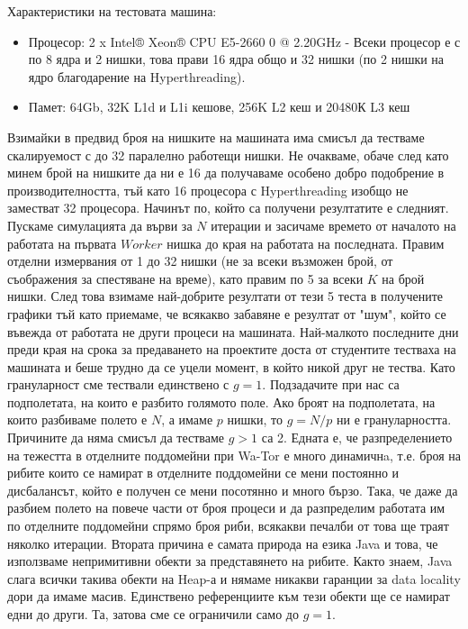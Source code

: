 \documentclass[12pt]{article}
\begin{document}
Характеристики на тестовата машина: 
\begin{itemize}
	\item Процесор: 2 x Intel® Xeon® CPU E5-2660 0 @ 2.20GHz - Всеки процесор е с по 8 ядра и 2 нишки,
	това прави 16 ядра общо и 32 нишки (по 2 нишки на ядро благодарение на Hyperthreading).
	\item Памет: 64Gb, 32K L1d и L1i кешове, 256K L2 кеш и 20480К L3 кеш
\end{itemize}
Взимайки в предвид броя на нишките на машината има смисъл да тестваме скалируемост с до 32 паралелно работещи нишки.
Не очакваме, обаче след като минем брой на нишките да ни е 16 да получаваме особено добро подобрение в производителността,
тъй като 16 процесора с Hyperthreading изобщо не заместват 32 процесора.
\bigbreak
Начинът по, който са получени резултатите е следният. Пускаме симулацията да върви за $N$ итерации
и засичаме времето от началото на работата на първата $Worker$ нишка до края на работата на последната.
Правим отделни измервания от 1 до 32 нишки (не за всеки възможен брой, от съображения за
спестяване на време), като правим по 5 за всеки $K$ на брой нишки. След това
взимаме най-добрите резултати от тези 5 теста в получените графики тъй като приемаме, че всякакво забавяне е резултат от
"шум", който се въвежда от работата не други процеси на машината. Най-малкото последните дни преди края
на срока за предаването на проектите доста от студентите тестваха на машината и беше трудно да се уцели
момент, в който никой друг не тества.
\bigbreak
Като грануларност сме тествали единствено с $g = 1$. Подзадачите при нас са подполетата, на които е разбито голямото поле.
Ако броят на подполетата, на които разбиваме полето е $N$, а имаме $p$ нишки, то $g = N/p$ ни е грануларността.
Причините да няма смисъл да тестваме $g > 1$ са 2. Едната е, че разпределението на тежестта в отделните поддомейни
при Wa-Tor е много динамичнa, т.е. броя на рибите които се намират в отделните поддомейни се мени постоянно и дисбалансът,
който е получен се мени посотянно и много бързо. Така, че даже да разбием полето на повече части от броя процеси и да
разпределим работата им по отделните поддомейни спрямо броя риби, всякакви печалби от това ще траят няколко итерации.
Втората причина е самата природа на езика Java и това, че използваме непримитивни обекти за представянето на рибите.
Както знаем, Java слага всички такива обекти на Heap-а и нямаме никакви гаранции за data locality дори да имаме масив.
Единствено референциите към тези обекти ще се намират едни до други. Та, затова сме се ограничили само до $g = 1$.
\end{document}
